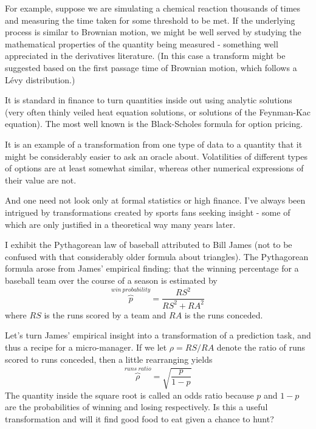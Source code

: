 For example, suppose  we are simulating a chemical reaction thousands of times and measuring the time taken for some threshold to be met. If the underlying process is similar to Brownian motion, we might be well served by studying the mathematical properties of the quantity being measured - something well appreciated in the derivatives literature. (In this case a transform might be suggested based on the first passage time of Brownian motion, which follows a L\'evy distribution.)

It is standard in finance to turn quantities inside out using analytic solutions (very often thinly veiled heat equation solutions, or solutions of the Feynman-Kac equation). The most well known is the Black-Scholes formula for option pricing.

It is an example of a transformation from one type of data to a quantity that it might be considerably easier to ask an oracle about. Volatilities of different types of options are at least somewhat similar, whereas other numerical expressions of their value are not. 

And one need not look only at formal statistics or high finance. I've always been intrigued by transformations created by sports fans seeking insight - some of which are only justified in a theoretical way many years later. 

I exhibit the Pythagorean law of baseball attributed to Bill James (not to be confused with that considerably older formula about triangles). The Pythagorean formula arose from James' empirical finding: that the winning percentage for a baseball team over the course of a season is estimated by
\begin{equation}
\label{eqn:pythagorean}
    \overbrace{p}^{win\ probability} = \frac{RS^2}{RS^2+RA^2}
\end{equation}
where $RS$ is the runs scored by a team and $RA$ is the runs conceded. 

Let's turn James' empirical insight into a transformation of a prediction task, and thus a recipe for a micro-manager. If we let $\rho=RS/RA$ denote the ratio of runs scored to runs conceded, then a little rearranging yields
$$
       \overbrace{\rho}^{runs\ ratio} = \sqrt{\frac{p}{1-p}}
$$
The quantity inside the square root is called an odds ratio because $p$ and $1-p$ are the probabilities of winning and losing respectively. Is this a useful transformation and will it find good food to eat given a chance to hunt? 

